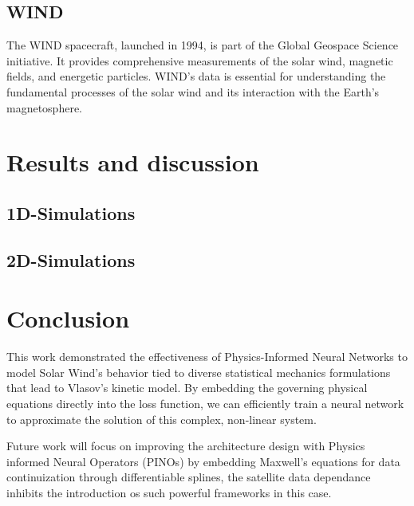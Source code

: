 \documentclass[12pt]{article}
\begin{document}
\subsection{WIND}
The WIND spacecraft, launched in 1994, is part of the Global Geospace Science initiative. It provides comprehensive measurements of the solar wind, magnetic fields, and energetic particles. WIND's data is essential for understanding the fundamental processes of the solar wind and its interaction with the Earth's magnetosphere.

\section{Results and discussion}

\subsection{1D-Simulations}

\subsection{2D-Simulations}

\section{Conclusion}
This work demonstrated the effectiveness of Physics-Informed Neural Networks to model Solar Wind's behavior tied to diverse statistical mechanics formulations that lead to Vlasov's kinetic model. By embedding the governing physical equations directly into the loss function, we can efficiently train a neural network to approximate the solution of this complex, non-linear system.

Future work will focus on improving the architecture design with Physics informed Neural Operators (PINOs) \cite{li2023physicsinformedneuraloperatorlearning} by embedding Maxwell's equations for data continuization through differentiable splines, the satellite data dependance inhibits the introduction os such powerful frameworks in this case.




\end{document}
